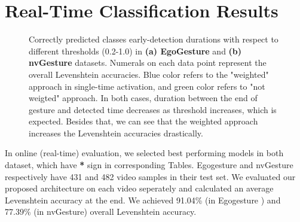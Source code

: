 \section{Real-Time Classification Results}
\begin{figure}[b!]%
\centering
{}%
\label{fig:staego}%
\qquad
{}%
\caption{Correctly predicted classes early-detection durations with respect to different thresholds (0.2-1.0) in \textbf{(a) EgoGesture} and  
\textbf{(b) nvGesture} datasets. Numerals on each data point represent the overall Levenshtein accuracies. Blue color refers to the "weighted" approach in single-time activation, and green color refers to "not weigted" approach. In both cases, duration between the end of gesture and detected time decreases as threshold increases, which is expected. Besides that, we can see that the weighted approach increases the Levenshtein accuracies drastically.}
\label{fig:stanv}
\end{figure}
 In online (real-time) evaluation, we selected best performing models in both dataset, which have \textbf{*} sign in corresponding Tables. Egogesture and nvGesture respectively have 431 and 482 video samples in their test set. We evaluated our proposed architecture on each video seperately and calculated an average Levenshtein accuracy at the end. We achieved 91.04\% (in Egogesture ) and 77.39\% (in nvGesture) overall Levenshtein accuracy.\\

